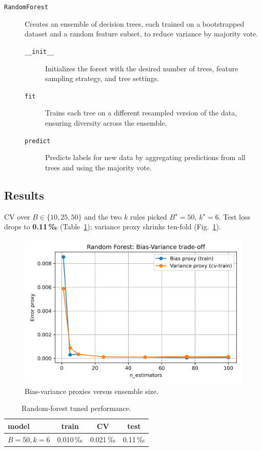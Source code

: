 \documentclass[12pt]{report}
\begin{document}
\begin{description}
  \item[\texttt{RandomForest}]
        Creates an ensemble of decision trees, each trained on a bootstrapped
        dataset and a random feature subset, to reduce variance by majority vote.
    \begin{description}
      \item[\texttt{\_\_init\_\_}]
            Initializes the forest with the desired number of trees, feature sampling
            strategy, and tree settings.
      \item[\texttt{fit}]
            Trains each tree on a different resampled version of the data, ensuring
            diversity across the ensemble.
      \item[\texttt{predict}]
            Predicts labels for new data by aggregating predictions from all trees and
            using the majority vote.
    \end{description}
\end{description}

\subsection{Results}
CV over $B\!\in\!\{10,25,50\}$ and the two $k$ rules picked $B^\star=50$,
$k^\star=6$.  Test loss drops to \textbf{0.11\,‰} (Table~\ref{tab:rf-res});
variance proxy shrinks ten-fold (Fig.~\ref{fig:rf-bv}).

\begin{figure}[ht]
  \centering
  \includegraphics[width=.65\linewidth]{../plots/rf_sweep_bias_variance_approx.png}
  \caption{Bias-variance proxies versus ensemble size.}
  \label{fig:rf-bv}
\end{figure}

\begin{table}[ht]
  \centering
  \caption{Random-forest tuned performance.}
  \label{tab:rf-res}
  \begin{tabular}{lccc}
    \toprule
    model & train & CV & test \\ \midrule
    $B=50,k=6$ & 0.010\,‰ & 0.021\,‰ & 0.11\,‰ \\
    \bottomrule
  \end{tabular}
\end{table}
\end{document}
